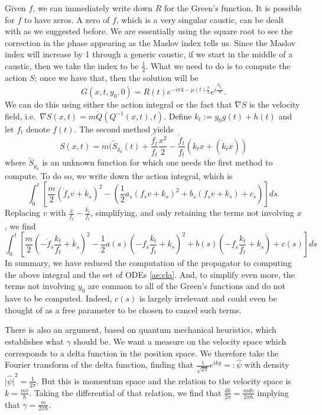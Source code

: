 \documentclass[11pt]{article}
\theoremstyle{remark}
\begin{document}
Given $f$, we can immediately write down  $R$  for the Green's
function. 
It is possible for $f$ to have zeros. A zero of $f$, 
which is a very singular caustic, 
  can be dealt with as we suggested before. 
We are essentially  using the square root to see the correction in the phase
appearing as the Maslov index tells us. Since the Maslov index will
increase by 1 through a generic caustic, if we start in the middle of a
caustic, then we take the index to be $\frac{1}{2}$. 
What we need to do is to compute the action $S$; once we have that,
then the solution will be 
\[G(x,t, y_0, 0) = R(t) e^{-i{\pi}{4} - \mu(t)\frac{\pi}{2}}
e^{i\frac{S_{y_{t_{0}}}}{\ensuremath{\hbar}}}. 
\] We
can do this using either the action integral or the fact that $\nabla
S$ is the velocity field, i.e.\ $\nabla S (x,t) = m \dot{Q}(Q^{-1}(x,t),
t)$.  
Define $k_t \ensuremath{:=} y_0 g(t) + h(t)$ and let $f_t$ denote $f(t)$.
 The second method yields 
\[S(x,t) = m(\tilde{S}_{y_0}(t) +
\frac{\dot{f}_t}{f_t}\frac{x^2}{2} 
- \frac{\dot{f}_t}{f_t}(k_t  x
+ (\dot{k}_t x)) \] 
where $\tilde{S}_{y_0}$ is an unknown function for which one needs the first
method to compute. To do so, we write down the action integral, which
is 
\begin{equation*} 
\int_0^t [\frac{m}{2}(\dot{f}_s v + \dot k_s )^2  -(
\frac{1}{2} a_s (f_s v + k_s)^2 +  b_s (f_s v + k_s)
+c_s )] ds.
\end{equation*} 
Replacing $v$ with $\frac{x}{f_t} - \frac{k_t}{f_t}$, 
simplifying, and only retaining the terms not involving $x$, we find 
\begin{equation} \label{ae:int}
\int_0^t [\frac{m}{2}(-\dot{f}_s\frac{k_t}{f_t} +\dot{k}_s)^2
-\frac{1}{2} a(s) (-{f}_s\frac{k_t}{f_t} +{k}_s)^2 +b(s)
 (-{f}_s\frac{k_t}{f_t} +{k}_s) +c(s)] ds
\end{equation}
In summary, we have reduced the computation of the propagator to
computing the above integral and the set of ODEs \eqref{ae:cla}. And,
to simplify even more, the terms not involving $y_0$ are common to all
of the Green's functions and do not have to be computed. Indeed, $c(s)$ is
largely irrelevant and could even be thought of as 
 a free parameter to be chosen to cancel such
terms. 
  
There is also an argument, based on quantum mechanical heuristics, 
which establishes what $\gamma$ should be.
 We want a measure on the velocity space which corresponds
to a delta function in the position space. We therefore take the
Fourier transform of the delta function, finding that
$\frac{1}{\sqrt{2\pi}}e^{iky} \ensuremath{=:} \hat{\ensuremath{\psi}}$ 
with density $\ensuremath{\lvert {\hat{\ensuremath{\psi}}} \rvert}^2 =
\frac{1}{2\pi}$. But this is momentum space and the relation to the
velocity space is $k = \frac{mv}{\ensuremath{\hbar}}$. Taking the differential of that
relation, we find that $\frac{dk}{2\pi} = \frac{m dv}{2\pi\ensuremath{\hbar}}$
implying that $\gamma = \frac{m}{2\pi \ensuremath{\hbar}}$. 
\end{document}

